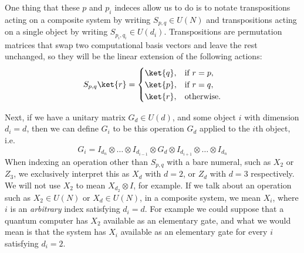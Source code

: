 One thing that these $p$ and $p_i$ indeces allow us to do is to notate transpositions acting on a composite system by writing $S_{p,q} \in U(N)$ and transpositions acting on a single object by writing $S_{p_i,q_i} \in U(d_i)$. Transpositions are permutation matrices that swap two computational basis vectors and leave the rest unchanged, so they will be the linear extension of the following actions:
\[S_{p,q}\ket{r} = \begin{cases}
\ket{q}, & \text{if\ } r = p, \\
\ket{p}, & \text{if\ } r = q, \\
\ket{r}, & \text{otherwise.}
\end{cases}\]

Next, if we have a unitary matrix $G_{d} \in U(d)$, and some object $i$ with dimension $d_i = d$, then we can define $G_i$ to be this operation $G_d$ applied to the $i$th object, i.e. 
\[G_i = I_{d_n}\otimes \dots \otimes I_{d_{i-1}} \otimes G_d \otimes I_{d_{i+1}} \otimes \dots \otimes I_{d_n}\]
When indexing an operation other than $S_{p,q}$ with a bare numeral, such as $X_2$ or $Z_3$, we exclusively interpret this as $X_d$ with $d = 2$, or $Z_d$ with $d = 3$ respectively. We will not use $X_2$ to mean $X_{d_2} \otimes I$, for example. If we talk about an operation such as  $X_2 \in U(N)$ or $X_d \in U(N)$, in a composite system, we mean $X_i$, where $i$ is an \emph{arbitrary} index satisfying $d_i = d$. For example we could suppose that a quantum computer has $X_2$ available as an elementary gate, and what we would mean is that the system has $X_i$ available as an elementary gate for every $i$ satisfying $d_i = 2$.


